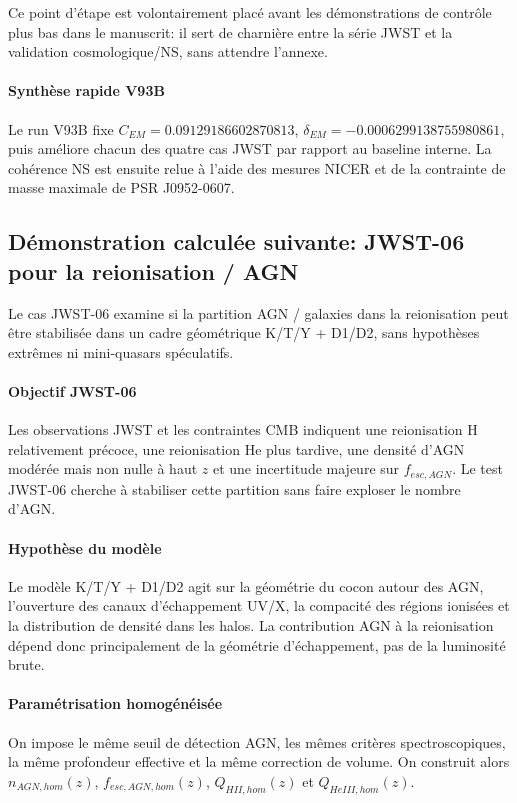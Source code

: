 \documentclass[11pt,a4paper]{article}
\begin{document}
Ce point d'étape est volontairement placé avant les démonstrations de contrôle plus bas dans le manuscrit: il sert de charnière entre la série JWST et la validation cosmologique/NS, sans attendre l'annexe.

\paragraph{Synthèse rapide V93B}
Le run V93B fixe $C_{EM}=0.09129186602870813$, $\delta_{EM}=-0.0006299138755980861$, puis améliore chacun des quatre cas JWST par rapport au baseline interne. La cohérence NS est ensuite relue à l'aide des mesures NICER et de la contrainte de masse maximale de PSR J0952-0607.

\subsection{Démonstration calculée suivante: JWST-06 pour la reionisation / AGN}
Le cas JWST-06 examine si la partition AGN / galaxies dans la reionisation peut être stabilisée dans un cadre géométrique K/T/Y + D1/D2, sans hypothèses extrêmes ni mini-quasars spéculatifs.

\paragraph{Objectif JWST-06}
Les observations JWST et les contraintes CMB indiquent une reionisation H relativement précoce, une reionisation He plus tardive, une densité d'AGN modérée mais non nulle à haut $z$ et une incertitude majeure sur $f_{esc,AGN}$. Le test JWST-06 cherche à stabiliser cette partition sans faire exploser le nombre d'AGN.

\paragraph{Hypothèse du modèle}
Le modèle K/T/Y + D1/D2 agit sur la géométrie du cocon autour des AGN, l'ouverture des canaux d'échappement UV/X, la compacité des régions ionisées et la distribution de densité dans les halos. La contribution AGN à la reionisation dépend donc principalement de la géométrie d'échappement, pas de la luminosité brute.

\paragraph{Paramétrisation homogénéisée}
On impose le même seuil de détection AGN, les mêmes critères spectroscopiques, la même profondeur effective et la même correction de volume. On construit alors $n_{AGN,hom}(z)$, $f_{esc,AGN,hom}(z)$, $Q_{HII,hom}(z)$ et $Q_{HeIII,hom}(z)$.
\end{document}
